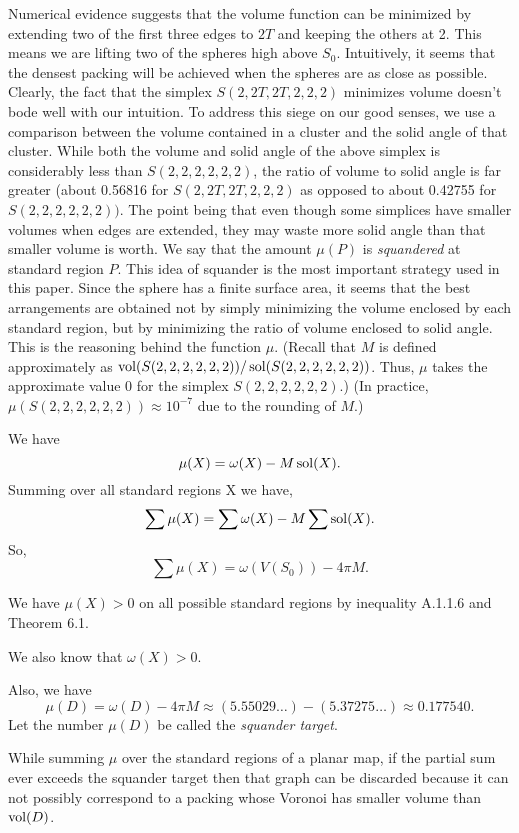 Numerical evidence suggests that 
the volume function can be minimized by extending two of the first three edges to $2T$ 
and keeping the others at 2.  This means we are lifting two of the spheres high above $S_0$. 
 Intuitively, it seems that the densest packing will be achieved when the spheres are as
 close as possible.  Clearly, the fact that the simplex $S(2,2T,2T,2,2,2)$ minimizes 
volume doesn't bode well with our intuition.  To address this siege on our good senses, we use a 
comparison between the volume contained in a cluster and the solid angle of that cluster.  
While both  the volume and solid angle of the above simplex is considerably less than 
$S(2,2,2,2,2,2)$, the ratio of volume to solid angle is far greater
(about 0.56816 for $S(2,2T,2T,2,2,2)$ as opposed to about 0.42755 for $S(2,2,2,2,2,2))$.  
The point being that even though some simplices have smaller volumes when edges are extended, they may 
waste more solid angle than that smaller  volume is worth.  We say that the 
amount $\mu(P)$ is {\it squandered} at standard region $P$.  This idea of squander 
is the most important strategy used in this paper.
Since the sphere has a finite surface area, it seems that the best arrangements are 
obtained not by simply minimizing the volume enclosed by each standard region, 
but by minimizing the ratio of volume enclosed to solid angle.  This is the reasoning 
behind the function $\mu$.  (Recall that $M$ is defined approximately as 
$\operatorname{vol}(S(2,2,2,2,2,2))/\operatorname{sol}(S(2,2,2,2,2,2))$.  Thus, $\mu$ takes the approximate value $0$ for
 the simplex $S(2,2,2,2,2,2)$.)  (In practice, $\mu(S(2,2,2,2,2,2))\approx 
10^{-7}$ due to the 
rounding of $M$.)  


We have $$\mu(X)=\omega(X)-M \operatorname{sol}(X).$$
Summing over all standard regions X we have,
$$\sum \mu(X)=\sum \omega(X)-M \sum \operatorname{sol}(X).$$
So,
$$\sum \mu(X)=\omega(V(S_0))-4 \pi M.$$

We have $\mu(X)>0$ on all possible standard regions 
by inequality A.1.1.6 and Theorem 6.1.  

We also know that $\omega(X)>0$.

Also, we have $$\mu(D)=\omega(D)-4 \pi M \approx (5.55029\dots) -( 5.37275\dots) \approx 0.177540.$$  
Let the number $\mu(D)$ %
be called the {\it squander target}.  

While summing $\mu$ over the standard regions of a planar map, if the partial sum ever
 exceeds the squander target then that graph can be discarded because it can not 
possibly correspond to a packing whose Voronoi has smaller volume than $\operatorname{vol}(D)$.

